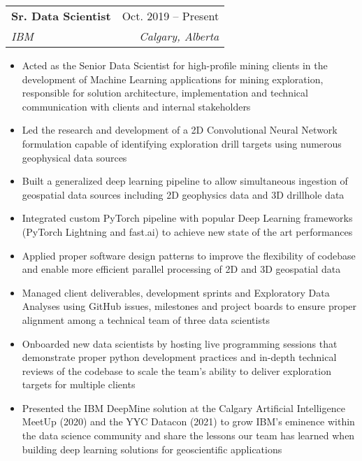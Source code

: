 \documentclass[letterpaper,11pt]{article}
\makeatletter
\newcommand{\resumeItem}[1]{
  \item\small{
    {#1 \vspace{-2pt}}
  }
}
\newcommand{\resumeSubheading}[4]{
  \vspace{-2pt}\item
    \begin{tabular*}{0.97\textwidth}[t]{l@{\extracolsep{\fill}}r}
      \textbf{#1} & #2 \\
      \textit{\small#3} & \textit{\small #4} \\
    \end{tabular*}\vspace{-7pt}
}
\newcommand{\resumeItemListStart}{\begin{itemize}}
\newcommand{\resumeItemListEnd}{\end{itemize}\vspace{-5pt}}
\makeatother
\begin{document}
    \resumeSubheading
      {Sr. Data Scientist}{Oct. 2019 -- Present}
      {IBM}{Calgary, Alberta}
      \resumeItemListStart
        \resumeItem{Acted as the Senior Data Scientist for high-profile mining clients in the development of Machine Learning 
        applications for mining exploration, responsible for solution architecture, implementation and technical communication 
        with clients and internal stakeholders}
        \resumeItem{Led the research and development of a 2D Convolutional Neural Network formulation capable of identifying 
        exploration drill targets using numerous geophysical data sources}
        \resumeItem{Built a generalized deep learning pipeline to allow simultaneous ingestion of geospatial data 
        sources including 2D geophysics data and 3D drillhole data}
        \resumeItem{Integrated custom PyTorch pipeline with popular Deep Learning frameworks 
        (PyTorch Lightning and fast.ai) to achieve new state of the art performances}
        \resumeItem{Applied proper software design patterns to improve the flexibility of codebase and enable more efficient
        parallel processing of 2D and 3D geospatial data}
        \resumeItem{Managed client deliverables, development sprints and Exploratory Data Analyses using
        GitHub issues, milestones and project boards to ensure proper alignment among a technical team of 
        three data scientists}
        \resumeItem{Onboarded new data scientists by hosting live programming sessions that demonstrate proper 
        python development practices and in-depth technical reviews of the codebase to scale the team's ability to 
        deliver exploration targets for multiple clients}
        \resumeItem{Presented the IBM DeepMine solution at the Calgary Artificial Intelligence MeetUp (2020) and the YYC Datacon (2021) to grow 
        IBM’s eminence within the data science community and share the lessons our team has learned when building 
        deep learning solutions for geoscientific applications}
      \resumeItemListEnd
\end{document}
